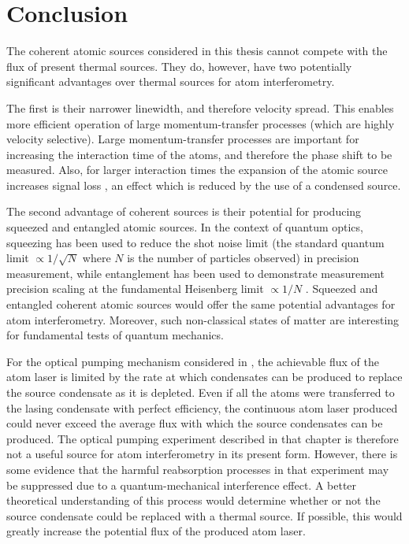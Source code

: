 \chapter{Conclusion}
\label{Conclusion}
\graphicspath{{Figures/Conclusion/}{Figures/Common/}}

The coherent atomic sources considered in this thesis cannot compete with the flux of present thermal sources.  They do, however, have two potentially significant advantages over thermal sources for atom interferometry.

The first is their narrower linewidth, and therefore velocity spread.  This enables more efficient operation of large momentum-transfer processes (which are highly velocity selective).  Large momentum-transfer processes are important for increasing the interaction time of the atoms, and therefore the phase shift to be measured.  Also, for larger interaction times the expansion of the atomic source increases signal loss \citep{Dimopoulos:2007uq}, an effect which is reduced by the use of a condensed source.

The second advantage of coherent sources is their potential for producing squeezed and entangled atomic sources.  In the context of quantum optics, squeezing has been used to reduce the shot noise limit (the standard quantum limit $\propto 1/\sqrt{N}$ where $N$ is the number of particles observed) in precision measurement, while entanglement has been used to demonstrate measurement precision scaling at the fundamental Heisenberg limit $\propto 1/N$ \citep{Leibfried:2004}.  Squeezed and entangled coherent atomic sources would offer the same potential advantages for atom interferometry.  Moreover, such non-classical states of matter are interesting for fundamental tests of quantum mechanics.



For the optical pumping mechanism considered in , the achievable flux of the atom laser is limited by the rate at which condensates can be produced to replace the source condensate as it is depleted.  Even if all the atoms were transferred to the lasing condensate with perfect efficiency, the continuous atom laser produced could never exceed the average flux with which the source condensates can be produced.  The optical pumping experiment described in that chapter is therefore not a useful source for atom interferometry in its present form.  However, there is some evidence that the harmful reabsorption processes in that experiment may be suppressed due to a quantum-mechanical interference effect.  A better theoretical understanding of this process would determine whether or not the source condensate could be replaced with a thermal source.  If possible, this would greatly increase the potential flux of the produced atom laser.

